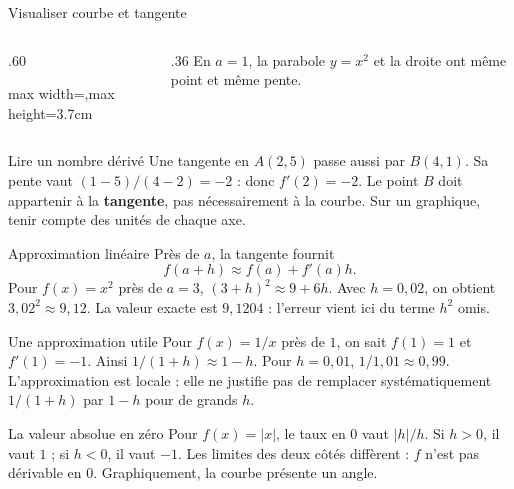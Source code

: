 \documentclass[aspectratio=169,12pt]{beamer}
\begin{document}
\renewcommand{\slidekind}{COMPRENDRE}
\begin{frame}[t,fragile]{Visualiser courbe et tangente}
\begin{columns}[c,onlytextwidth]\begin{column}{.60\textwidth}\centering\begin{adjustbox}{max width=\linewidth,max height=3.7cm}\end{adjustbox}\end{column}\begin{column}{.36\textwidth} En $a=1$, la parabole $y=x^2$ et la droite ont même point et même pente.\end{column}\end{columns}
\end{frame}
\renewcommand{\slidekind}{COMPRENDRE}
\begin{frame}[t,fragile]{Lire un nombre dérivé}
Une tangente en $A(2,5)$ passe aussi par $B(4,1)$. Sa pente vaut $(1-5)/(4-2)=-2$ : donc $f\prime(2)=-2$. Le point $B$ doit appartenir à la \textbf{tangente}, pas nécessairement à la courbe. Sur un graphique, tenir compte des unités de chaque axe.
\end{frame}
\renewcommand{\slidekind}{COMPRENDRE}
\begin{frame}[t,fragile]{Approximation linéaire}
Près de $a$, la tangente fournit \[f(a+h)\approx f(a)+f\prime(a)h.\] Pour $f(x)=x^2$ près de $a=3$, $(3+h)^2\approx9+6h$. Avec $h=0,02$, on obtient $3,02^2\approx9,12$. La valeur exacte est $9,1204$ : l’erreur vient ici du terme $h^2$ omis.
\end{frame}
\renewcommand{\slidekind}{COMPRENDRE}
\begin{frame}[t,fragile]{Une approximation utile}
Pour $f(x)=1/x$ près de $1$, on sait $f(1)=1$ et $f\prime(1)=-1$. Ainsi $1/(1+h)\approx1-h$. Pour $h=0,01$, $1/1,01\approx0,99$. L’approximation est locale : elle ne justifie pas de remplacer systématiquement $1/(1+h)$ par $1-h$ pour de grands $h$.
\end{frame}
\renewcommand{\slidekind}{COMPRENDRE}
\begin{frame}[t,fragile]{La valeur absolue en zéro}
Pour $f(x)=|x|$, le taux en $0$ vaut $|h|/h$. Si $h>0$, il vaut $1$ ; si $h<0$, il vaut $-1$. Les limites des deux côtés diffèrent : $f$ n’est pas dérivable en $0$. Graphiquement, la courbe présente un angle.
\end{frame}
\end{document}
